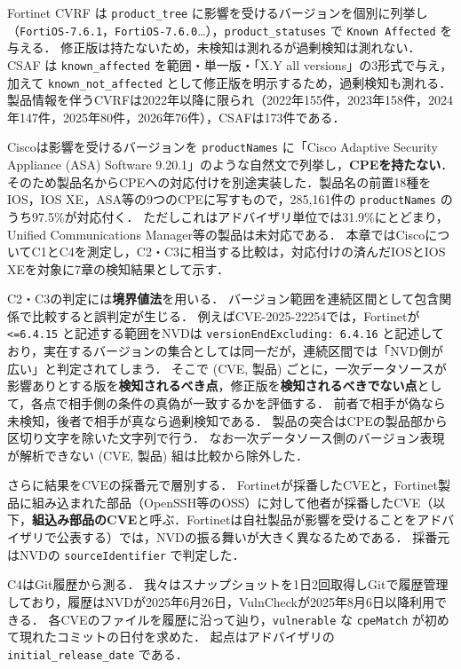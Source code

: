 Fortinet CVRF は \texttt{product\_tree} に影響を受けるバージョンを個別に列挙し（\texttt{FortiOS-7.6.1}，\texttt{FortiOS-7.6.0}…），\texttt{product\_statuses} で \texttt{Known Affected} を与える．
修正版は持たないため，未検知は測れるが過剰検知は測れない．
CSAF は \texttt{known\_affected} を範囲・単一版・「X.Y all versions」の3形式で与え，加えて \texttt{known\_not\_affected} として修正版を明示するため，過剰検知も測れる．
製品情報を伴うCVRFは2022年以降に限られ（2022年155件，2023年158件，2024年147件，2025年80件，2026年76件），CSAFは173件である．

Ciscoは影響を受けるバージョンを \texttt{productNames} に「Cisco Adaptive Security Appliance (ASA) Software 9.20.1」のような自然文で列挙し，\textbf{CPEを持たない}．
そのため製品名からCPEへの対応付けを別途実装した．製品名の前置18種をIOS，IOS XE，ASA等の9つのCPEに写すもので，285,161件の \texttt{productNames} のうち97.5\%が対応付く．
ただしこれはアドバイザリ単位では31.9\%にとどまり，Unified Communications Manager等の製品は未対応である．
本章ではCiscoについてC1とC4を測定し，C2・C3に相当する比較は，対応付けの済んだIOSとIOS XEを対象に7章の検知結果として示す．

C2・C3の判定には\textbf{境界値法}を用いる．
バージョン範囲を連続区間として包含関係で比較すると誤判定が生じる．
例えばCVE-2025-22254では，Fortinetが \texttt{<=6.4.15} と記述する範囲をNVDは \texttt{versionEndExcluding: 6.4.16} と記述しており，実在するバージョンの集合としては同一だが，連続区間では「NVD側が広い」と判定されてしまう．
そこで (CVE, 製品) ごとに，一次データソースが影響ありとする版を\textbf{検知されるべき点}，修正版を\textbf{検知されるべきでない点}として，各点で相手側の条件の真偽が一致するかを評価する．
前者で相手が偽なら未検知，後者で相手が真なら過剰検知である．
製品の突合はCPEの製品部から区切り文字を除いた文字列で行う．
なお一次データソース側のバージョン表現が解析できない (CVE, 製品) 組は比較から除外した．

さらに結果をCVEの採番元で層別する．
Fortinetが採番したCVEと，Fortinet製品に組み込まれた部品（OpenSSH等のOSS）に対して他者が採番したCVE（以下，\textbf{組込み部品のCVE}と呼ぶ．Fortinetは自社製品が影響を受けることをアドバイザリで公表する）では，NVDの振る舞いが大きく異なるためである．
採番元はNVDの \texttt{sourceIdentifier} で判定した．

C4はGit履歴から測る．
我々はスナップショットを1日2回取得しGitで履歴管理しており\cite{vuls-data-db}，履歴はNVDが2025年6月26日，VulnCheckが2025年8月6日以降利用できる．
各CVEのファイルを履歴に沿って辿り，\texttt{vulnerable} な \texttt{cpeMatch} が初めて現れたコミットの日付を求めた．
起点はアドバイザリの \texttt{initial\_release\_date} である．

